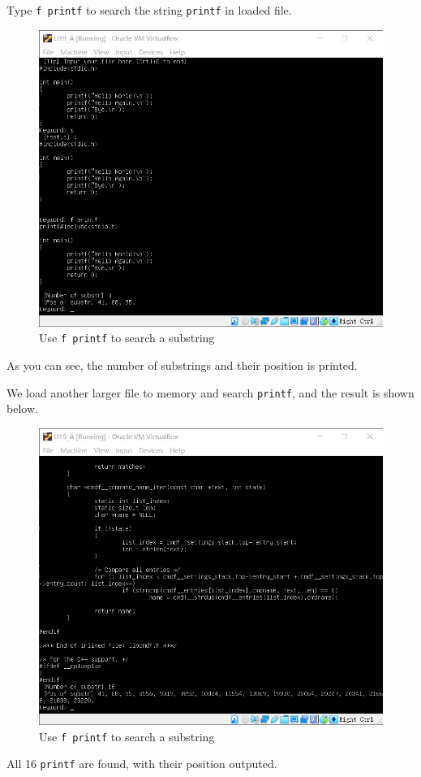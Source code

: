 \documentclass[cn,black,12pt,normal]{elegantnote}
\begin{document}
Type \lstinline{f printf} to search the string \lstinline{printf} in loaded file.

\begin{figure}[H]
    \centering
    \includegraphics[width=0.6\linewidth]{image/kmp_04.jpg}
    \caption{Use \lstinline{f printf} to search a substring}
\end{figure}

As you can see, the number of substrings and their position is printed.

We load another larger file to memory and search \lstinline{printf}, and the result is shown below.

\begin{figure}[H]
    \centering
    \includegraphics[width=0.6\linewidth]{image/kmp_05.jpg}
    \caption{Use \lstinline{f printf} to search a substring}
\end{figure}

All 16 \lstinline{printf} are found, with their position outputed.
\end{document}
